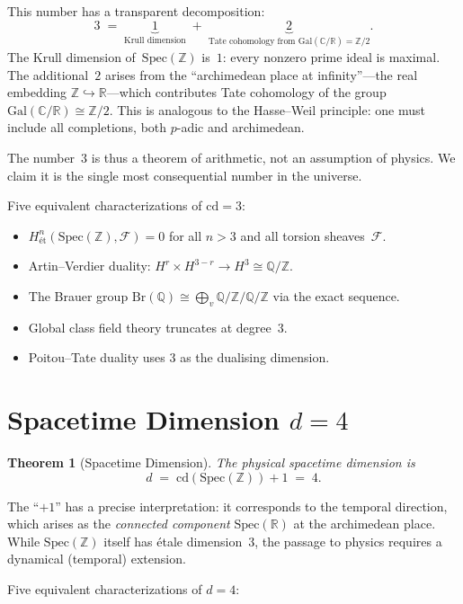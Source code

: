 \documentclass[12pt,a4paper]{article}
\newtheorem{theorem}{Theorem}[section]
\theoremstyle{definition}
\newcommand{\Spec}{\mathrm{Spec}}
\newcommand{\cd}{\mathrm{cd}}
\newcommand{\Gal}{\mathrm{Gal}}
\newcommand{\Z}{\mathbb{Z}}
\newcommand{\Q}{\mathbb{Q}}
\newcommand{\R}{\mathbb{R}}
\newcommand{\C}{\mathbb{C}}
\begin{document}
This number has a transparent decomposition:
\[
  3 \;=\; \underbrace{1}_{\text{Krull dimension}}
        \;+\; \underbrace{2}_{\text{Tate cohomology from }\Gal(\C/\R)=\Z/2}.
\]
The Krull dimension of~$\Spec(\Z)$ is~$1$: every nonzero prime ideal is maximal.
The additional~$2$ arises from the ``archimedean place at infinity''---the real embedding
$\Z\hookrightarrow\R$---which contributes Tate cohomology of the group $\Gal(\C/\R)\cong\Z/2$.
This is analogous to the Hasse--Weil principle: one must include all completions,
both $p$-adic and archimedean.

The number~$3$ is thus a theorem of arithmetic, not an assumption of physics.
We claim it is the single most consequential number in the universe.

Five equivalent characterizations of $\cd=3$:
\begin{itemize}
\item[(C1)] $H^n_{\text{\'et}}(\Spec(\Z),\mathscr{F})=0$ for all $n>3$ and all torsion sheaves~$\mathscr{F}$.
\item[(C2)] Artin--Verdier duality: $H^r\times H^{3-r}\to H^3\cong\Q/\Z$.
\item[(C3)] The Brauer group $\mathrm{Br}(\Q)\cong\bigoplus_v\Q/\Z\big/\Q/\Z$ via the exact sequence.
\item[(C4)] Global class field theory truncates at degree~$3$.
\item[(C5)] Poitou--Tate duality uses $3$ as the dualising dimension.
\end{itemize}

\section{Spacetime Dimension $d=4$}\label{sec:spacetime}

\begin{theorem}[Spacetime Dimension]\label{thm:d4}
The physical spacetime dimension is
\[
  d \;=\; \cd(\Spec(\Z))+1 \;=\; 4.
\]
\end{theorem}

The ``$+1$'' has a precise interpretation: it corresponds to the temporal direction,
which arises as the \emph{connected component} $\Spec(\R)$ at the archimedean place.
While $\Spec(\Z)$ itself has \'etale dimension~$3$, the passage to physics requires
a dynamical (temporal) extension.

Five equivalent characterizations of $d=4$:
\end{document}
